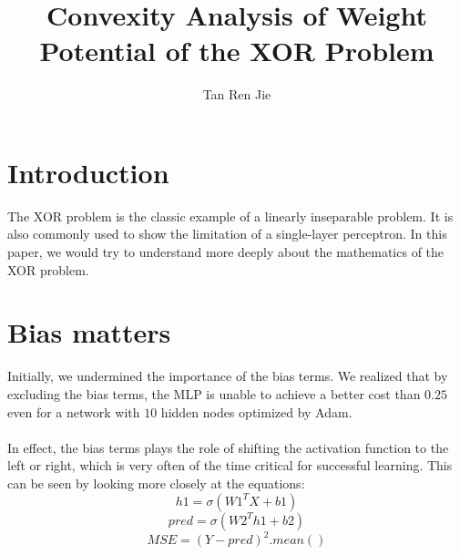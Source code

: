 \documentclass{article}
\begin{document}
\author{Tan Ren Jie}
\title{Convexity Analysis of Weight Potential of the XOR Problem}
\maketitle
\section{Introduction}
The XOR problem is the classic example of a linearly inseparable problem. It is also commonly used to show the limitation of a single-layer perceptron. In this paper, we would try to understand more deeply about the mathematics of the XOR problem.
\section{Bias matters}
Initially, we undermined the importance of the bias terms. We realized that by excluding the bias terms, the MLP is unable to achieve a better cost than $0.25$ even for a network with $10$ hidden nodes optimized by Adam. \\ \\
In effect, the bias terms plays the role of shifting the activation function to the left or right, which is very often of the time critical for successful learning. This can be seen by looking more closely at the equations:
$$h1 = \sigma(W1^TX + b1)$$
$$pred = \sigma(W2^Th1 + b2)$$
$$MSE = (Y - pred)^2.mean()$$
\end{document}

